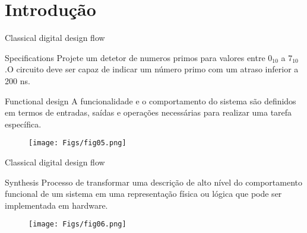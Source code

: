 \documentclass[aspectratio=169]{beamer}
\begin{document}
\section{Introdução}
\begin{frame}{Classical digital design flow}
	
	
	\begin{block}{Specifications}
	\justifying
	Projete um detetor de numeros primos para valores entre $0_{10}$ a $7_{10}$.O circuito deve ser capaz de indicar um número primo com um atraso inferior a 200 ns.
	\end{block}	
	
	
	\begin{block}{Functional design}
	\justifying
	A funcionalidade e o comportamento do sistema são definidos em termos de entradas, saídas e operações necessárias para realizar uma tarefa específica. 
	\end{block}		
	
	\begin{figure}[h]
		\centering
		\texttt{[image: Figs/fig05.png]}
	\end{figure}
	
\end{frame}

\begin{frame}{Classical digital design flow}
	
	
	\begin{block}{Synthesis}
		\justifying
		Processo de transformar uma descrição de alto nível do comportamento funcional de um sistema em uma representação física ou lógica que pode ser implementada em hardware.
	\end{block}	
	
	\begin{figure}[h]
	\centering
	\texttt{[image: Figs/fig06.png]}
	\end{figure}
	
\end{frame}
\end{document}
